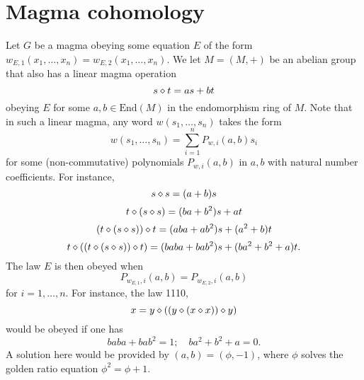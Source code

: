 \chapter{Magma cohomology}\label{cohomology-chapter}

Let $G$ be a magma obeying some equation $E$ of the form $w_{E,1}(x_1,\dots,x_n) = w_{E,2}(x_1,\dots,x_n)$.  We let $M = (M,+)$ be an abelian group that also has a linear magma operation
$$ s \diamond t = as + bt$$
obeying $E$ for some $a,b \in \mathrm{End}(M)$ in the endomorphism ring of $M$.  Note that in such a linear magma, any word $w(s_1,\dots,s_n)$ takes the form
$$ w(s_1,\dots,s_n) = \sum_{i=1}^n P_{w,i}(a,b) s_i$$
for some (non-commutative) polynomials $P_{w,i}(a,b)$ in $a,b$ with natural number coefficients.  For instance,
$$ s \diamond s = (a+b) s$$
$$ t \diamond (s \diamond s) = (ba+b^2) s + at$$
$$ (t \diamond (s \diamond s)) \diamond t = (aba+ab^2) s + (a^2+b)t$$
$$ t \diamond ((t \diamond (s \diamond s)) \diamond t) = (baba+bab^2) s + (ba^2+b^2+a)t.$$
The law $E$ is then obeyed when
$$ P_{w_{E,1},i}(a,b)= P_{w_{E,2},i}(a,b)$$
for $i=1,\dots,n$.  For instance, the law 1110,
\begin{equation}\label{1110}
  x = y \diamond ((y \diamond (x \diamond x)) \diamond y)
\end{equation}
would be obeyed if one has
\begin{equation}\label{baba}
 baba+bab^2 = 1; \quad ba^2+b^2+a = 0.
\end{equation}
A solution here would be provided by $(a,b) = (\phi,-1)$, where $\phi$ solves the golden ratio equation $\phi^2 = \phi + 1$.


